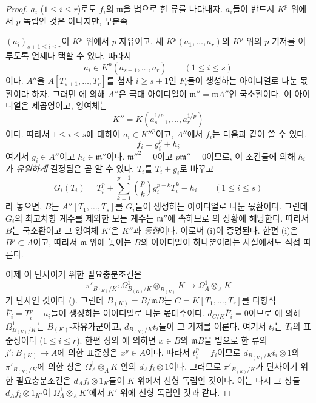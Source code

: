 \begin{proof}
$a_i$ ($1\leqslant i\leqslant r$)로도 $f_i$의 $\mathfrak m$을 법으로 한
류를 나타내자. $a_i$들이 반드시 $K^p$ 위에서 $p$-독립인 것은 아니지만,
부분족


$(a_i)_{s+1\leqslant i\leqslant r}$이 $K^p$ 위에서 $p$-자유이고,
체 $K^p(a_1,\ldots,a_r)$의 $K^p$ 위의 $p$-기저를 이루도록 언제나
택할 수 있다. 따라서
\[
  a_i\in K^p(a_{s+1},\ldots,a_r)\qquad(1\leqslant i\leqslant s)
\]
이다. $A''$을 $A[T_{s+1},\ldots,T_r]$를 첨자 $i\geqslant s+1$인
$F_i$들이 생성하는 아이디얼로 나눈 몫환이라 하자. 그러면
에 의해 $A''$은 극대 아이디얼이
$\mathfrak m''=\mathfrak mA''$인 국소환이다. 이 아이디얼은 제곱영이고,
잉여체는
\[
  K''=K(a_{s+1}^{1/p},\ldots,a_r^{1/p})
\]
이다. 따라서 $1\leqslant i\leqslant s$에 대하여 $a_i\in K''^p$이고,
$A''$에서 $f_i$는 다음과 같이 쓸 수 있다.
\begin{equation}
\label{0.22.4.7.3-ko}
  f_i=g_i^p+h_i
  \tag{22.4.7.3}
\end{equation}
여기서 $g_i\in A''$이고 $h_i\in\mathfrak m''$이다.
$\mathfrak m''^2=0$이고 $p\mathfrak m''=0$이므로, 이 조건들에 의해
$h_i$가 \emph{유일하게} 결정됨은 곧 알 수 있다. $T_i$를
$T_i+g_i$로 바꾸고
\[
  G_i(T_i)=T_i^p+\sum_{k=1}^{p-1}\binom pk g_i^{p-k}T_i^k-h_i
  \qquad(1\leqslant i\leqslant s)
\]
라 놓으면, $B$는 $A''[T_1,\ldots,T_s]$를 $G_i$들이 생성하는
아이디얼로 나눈 몫환이다. 그런데 $G_i$의 최고차항 계수를 제외한
모든 계수는 $\mathfrak m''$에 속하므로 의 상황에
해당한다. 따라서 $B$는 국소환이고 그 잉여체 $K'$은 $K''$과
\emph{동형}이다. 이로써 (i)이 증명된다. 한편 (i)은
$B^p\subset A$이고, 따라서 $\mathfrak m$ 위에 놓이는 $B$의 아이디얼이
하나뿐이라는 사실에서도 직접 따른다.

이제 이 단사이기 위한 필요충분조건은
\[
  \pi'_{B_{(K)}/K}:\Omega^1_{B_{(K)}/K}\otimes_{B_{(K)}}K
  \longrightarrow\Omega^1_A\otimes_AK
\]
가 단사인 것이다 (). 그런데
$B_{(K)}=B/\mathfrak mB$는 $C=K[T_1,\ldots,T_r]$를 다항식
$\overline F_i=T_i^p-a_i$들이 생성하는 아이디얼로 나눈 몫대수이다.
$d_{C/K}\overline F_i=0$이므로 에 의해
$\Omega^1_{B_{(K)}/K}$는 $B_{(K)}$-자유가군이고,
$d_{B_{(K)}/K}t_i$들이 그 기저를 이룬다. 여기서 $t_i$는 $T_i$의
표준상이다 ($1\leqslant i\leqslant r$). 한편 정의
에 의하면 $x\in B$의 $\mathfrak mB$을 법으로 한
류의 $j':B_{(K)}\longrightarrow A$에 의한 표준상은 $x^p\in A$이다.
따라서 $t_i^p=f_i$이므로
$d_{B_{(K)}/K}t_i\otimes1$의 $\pi'_{B_{(K)}/K}$에 의한 상은
$\Omega^1_A\otimes_AK$ 안의 $d_Af_i\otimes1$이다. 그러므로
$\pi'_{B_{(K)}/K}$가 단사이기 위한 필요충분조건은
$d_Af_i\otimes1_K$들이 $K$ 위에서 선형 독립인 것이다. 이는 다시
그 상들 $d_Af_i\otimes1_{K'}$이
$\Omega^1_A\otimes_AK'$에서 $K'$ 위에 선형 독립인 것과 같다.


\end{proof}
